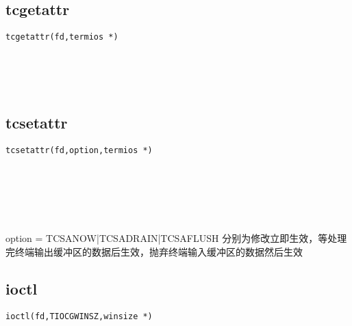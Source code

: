 \documentclass[10pt,a4paper]{article}
\begin{document}
\subsection{tcgetattr}
\begin{spacing}{2.0}
\lstset{language=C,numbers=none}
\begin{lstlisting}
tcgetattr(fd,termios *)
\end{lstlisting}
{\large\color[rgb]{0.2,0.4,0.6}{fd:}} \\
{\large\color[rgb]{0.2,0.4,0.6}{*:}}
\paragraph{ \ \ }
\end{spacing}

\subsection{tcsetattr}
\begin{spacing}{2.0}
\lstset{language=C,numbers=none}
\begin{lstlisting}
tcsetattr(fd,option,termios *)
\end{lstlisting}
{\large\color[rgb]{0.2,0.4,0.6}{fd:}} \\
{\large\color[rgb]{0.2,0.4,0.6}{option:}} \\
{\large\color[rgb]{0.2,0.4,0.6}{*:}}
\paragraph{ \ \ }option = TCSANOW|TCSADRAIN|TCSAFLUSH 分别为修改立即生效，等处理完终端输出缓冲区的数据后生效，抛弃终端输入缓冲区的数据然后生效
\end{spacing}

\subsection{ioctl}
\begin{spacing}{2.0}
\lstset{language=C,numbers=none}
\begin{lstlisting}
ioctl(fd,TIOCGWINSZ,winsize *)
\end{lstlisting}
{\large\color[rgb]{0.2,0.4,0.6}{fd:}} \\
{\large\color[rgb]{0.2,0.4,0.6}{TIOCGWINSZ:}} \\
{\large\color[rgb]{0.2,0.4,0.6}{*:}}
\paragraph{ \ \ }
\end{spacing}
\end{document}
